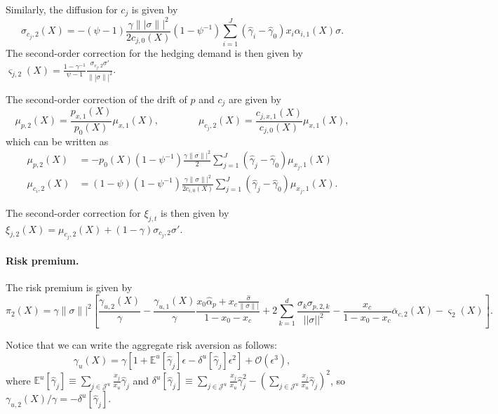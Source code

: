 Similarly, the diffusion for $c_j$ is given by
\begin{equation}
    \sigma_{c_j,2}(X) = -(\psi-1) \frac{\gamma \||\sigma\||^2}{2 c_{j,0}(X)} (1-\psi^{-1}) \sum_{i=1}^J\left( \hat{\gamma}_i - \hat{\gamma}_0 \right) x_i \alpha_{i,1}(X) \sigma.
\end{equation}
The second-order correction for the hedging demand is then given by $\varsigma_{j,2}(X) = \frac{1-\gamma^{-1}}{\psi-1} \frac{\sigma_{c_j,2} \sigma' }{\||\sigma\||^2}$.

The second-order correction of the drift of $p$ and $c_{j}$ are given by 
\begin{equation}
    \mu_{p,2}(X) = \frac{p_{x,1}(X)}{p_0(X)} \mu_{x,1}(X), \qquad \qquad 
    \mu_{c_j,2}(X) = \frac{c_{j,x,1}(X)}{c_{j,0}(X)} \mu_{x,1}(X),
\end{equation}
which can be written as
\begin{align}
    \mu_{p,2}(X) &= -p_0(X) (1-\psi^{-1}) \frac{\gamma\|\sigma\||^2}{2} \sum_{j=1}^J (\hat{\gamma}_j-\hat{\gamma}_0) \mu_{x_j,1}(X)\\
    \mu_{c_i,2}(X) &= (1-\psi)(1-\psi^{-1}) \frac{\gamma\|\sigma\||^2}{2 c_{i,0}(X)} \sum_{j=1}^J (\hat{\gamma}_j-\hat{\gamma}_0) \mu_{x_j,1}(X).
\end{align}

The second-order correction for $\xi_{j,t}$ is then given by $\xi_{j,2}(X) = \mu_{c_j,2}(X) + (1-\gamma) \sigma_{c_j,2} \sigma'$. 

\paragraph{Risk premium.} The risk premium is given by
\begin{equation}
    \pi_2(X) = \gamma \|\sigma\||^2\left[ \frac{\gamma_{u,2}(X)}{\gamma} - \frac{\gamma_{u,1}(X)}{\gamma} \frac{x_0 \hat{\alpha}_{p} + x_c \frac{\hat{\sigma}}{\|\sigma\||}}{1-x_0-x_c}  + 
    2\sum_{k=1}^d \frac{\sigma_k \sigma_{p,2,k}}{||\sigma||^ 2}
    -\frac{x_c}{1-x_0 -x_c} \overline{\alpha}_{c,2}(X) - \varsigma_{2}(X) \right].
\end{equation}

Notice that we can write the aggregate risk aversion as follows:
\begin{equation}
    \gamma_u(X) = \gamma \left[ 1 + \mathbb{E}^u[\hat{\gamma}_j] \epsilon - \delta^u[\hat{\gamma}_j] \epsilon^ 2 \right] + \mathcal{O}(\epsilon^3),
\end{equation}
where $\mathbb{E}^u[\hat{\gamma}_j] \equiv \sum_{j\in\mathcal{J}^u} \frac{x_j}{x_u} \hat{\gamma}_j$ and $\delta^u[\hat{\gamma}_j] \equiv \sum_{j\in\mathcal{J}^u} \frac{x_j}{x_u} \hat{\gamma}_j^ 2 - \left(\sum_{j\in\mathcal{J}^u} \frac{x_j}{x_u} \hat{\gamma}_j \right)^ 2$, so $\gamma_{u,2}(X) / \gamma = -\delta^u[\hat{\gamma}_j]$.

